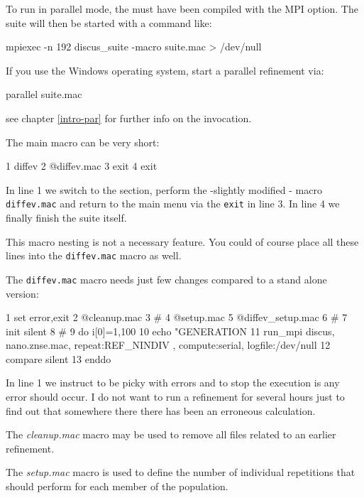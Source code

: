 To run in parallel mode, the \Suite must have been compiled with the MPI
option. The suite will then be started with a command like:

\begin{MacVerbatim}
   mpiexec -n 192 discus_suite -macro suite.mac  > /dev/null
\end{MacVerbatim}

If you use the Windows operating system, start a parallel refinement via:

\begin{MacVerbatim}
   parallel suite.mac
\end{MacVerbatim}

see chapter \ref{intro-par} for further info on the invocation.


The main \Suite macro can be very short:
\begin{MacVerbatim}
   1   diffev
   2      @diffev.mac
   3   exit
   4   exit
\end{MacVerbatim}

In line 1 we switch to the \Diffev section, perform the -slightly modified -
macro {\tt diffev.mac} and return to the main \Suite menu via the {\tt exit}
in line 3. In line 4 we finally finish the suite itself. 

This macro nesting is not a necessary feature. You could of 
course place all these lines into the {\tt diffev.mac} macro as well.

The {\tt diffev.mac} macro needs just few changes compared to a stand alone 
version:
\begin{MacVerbatim}
   1    set error,exit
   2    @cleanup.mac
   3    #
   4    @setup.mac
   5    @diffev_setup.mac
   6    #
   7    init silent
   8    #
   9    do i[0]=1,100
  10       echo "GENERATION %
  11       run_mpi discus, nano.znse.mac, repeat:REF_NINDIV , compute:serial, logfile:/dev/null
  12       compare silent
  13    enddo
\end{MacVerbatim}

In line 1 we instruct \Suite to be picky with errors and to stop the execution 
is any error should occur. I do not want to run a refinement for several 
hours just to find out that somewhere there there has been an erroneous 
calculation.

The {\it cleanup.mac} macro may be used to remove all files related to an 
earlier refinement.

The {\it setup.mac} macro is used to define the number of individual 
repetitions that \Discus should perform for each member of the population.

